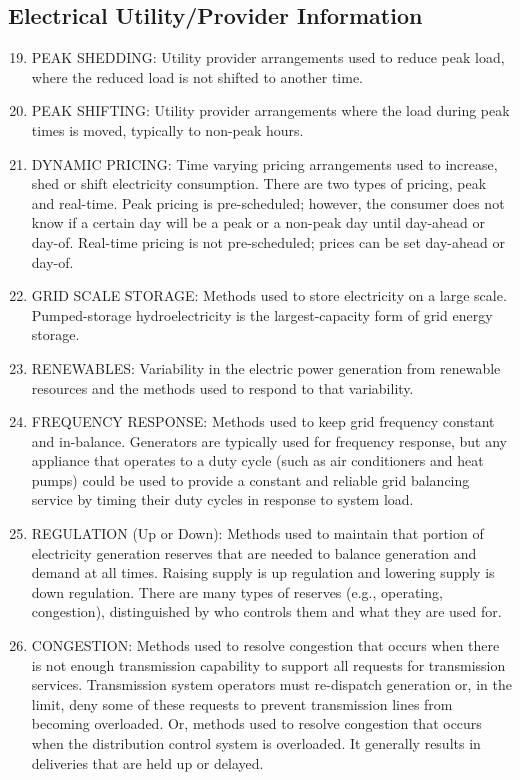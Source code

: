\subsection{Electrical Utility/Provider Information}

\begin{enumerate} [nosep]
\setcounter{enumi}{18}
\item
PEAK SHEDDING: Utility provider arrangements used to reduce peak load, where the reduced 
load is not shifted to another time.

\item
PEAK SHIFTING: Utility provider arrangements where the load during peak times is moved, 
typically to non-peak hours.

\item
DYNAMIC PRICING: Time varying pricing arrangements used to increase, shed or shift 
electricity consumption. There are two types of pricing, peak and real-time. 
Peak pricing is pre-scheduled; however, the consumer does not know if a certain day will be 
a peak or a non-peak day until day-ahead or day-of. Real-time pricing is not pre-scheduled; 
prices can be set day-ahead or day-of.

\item
GRID SCALE STORAGE: Methods used to store electricity on a large scale. Pumped-storage 
hydroelectricity is the largest-capacity form of grid energy storage.

\item
RENEWABLES: Variability in the electric power generation from renewable resources and 
the methods used to respond to that variability.

\item
FREQUENCY RESPONSE: Methods used to keep grid frequency constant and in-balance. 
Generators are typically used for frequency response, but any appliance that operates to 
a duty cycle (such as air conditioners and heat pumps) could be used to provide a constant 
and reliable grid balancing service by timing their duty cycles in response to system load. 

\item
REGULATION (Up or Down): Methods used to maintain that portion of electricity generation 
reserves that are needed to balance generation and demand at all times. Raising supply is 
up regulation and lowering supply is down regulation. There are many types of 
reserves (e.g., operating, congestion), distinguished by who controls them and what they are used for.

\item
CONGESTION: Methods used to resolve congestion that occurs when there is not enough 
transmission capability to support all requests for transmission services. Transmission 
system operators must re-dispatch generation or, in the limit, deny some of these 
requests to prevent transmission lines from becoming overloaded. Or, methods used to resolve 
congestion that occurs when the distribution control system is overloaded. It generally 
results in deliveries that are held up or delayed. 


\end{enumerate}
